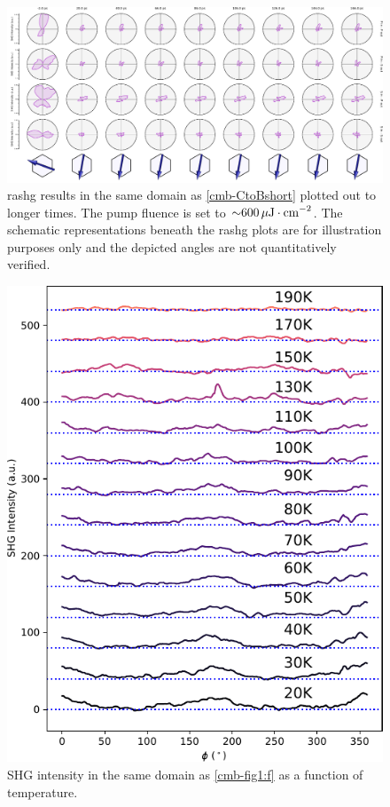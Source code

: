 \begin{landscape}
\begin{figure}
\centering
\includegraphics[width=\textwidth]{./gfx/ch6/C2B_long.pdf}
\caption{\label{cmb-CtoBlong}\gls{rashg} results in the same domain as \cref{cmb-CtoBshort} plotted out to longer times.
The pump fluence is set to ${\sim} \qty{600}{\mu J \cdot cm^{-2}}$.
\lastrow
The schematic representations beneath the \gls{rashg} plots are for illustration purposes only and the depicted angles are not quantitatively verified.
}
\end{figure}
\end{landscape}

\begin{figure}
\centering
\includegraphics[width=\textwidth]{./gfx/ch6/ctempdep.pdf}
\caption{\label{cmb-ctempdep}
SHG intensity in the same domain as \cref{cmb-fig1:f} as a function of temperature.
}
\end{figure}

